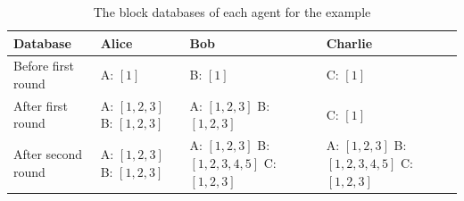 \begin{table}[h!]
    \centering
    \caption{The block databases of each agent for the example}
    \label{tab:blocks_example}
    \begin{tabular}{p{4cm}|p{3cm}|p{4cm}|p{3cm}}
        \toprule
        Database & Alice & Bob & Charlie \\
        \midrule
        Before first round & A: $[1]$ & B: $[1]$ & C: $[1]$ \\ \hline 
        After first round & A: $[1, 2, 3]$ \newline B: $[1, 2, 3]$ & A: $[1, 2, 3]$ \newline B: $[1, 2, 3]$ & C: $[1]$ \\ \hline
        After second round &  A: $[1, 2, 3]$ \newline B: $[1, 2, 3]$ & A: $[1, 2, 3]$ \newline B: $[1, 2, 3, 4, 5]$ \newline C: $[1, 2, 3]$ & A: $[1, 2, 3]$ \newline B: $[1, 2, 3, 4, 5]$ \newline C: $[1, 2, 3]$ \\
        \bottomrule
    \end{tabular}
\end{table}






